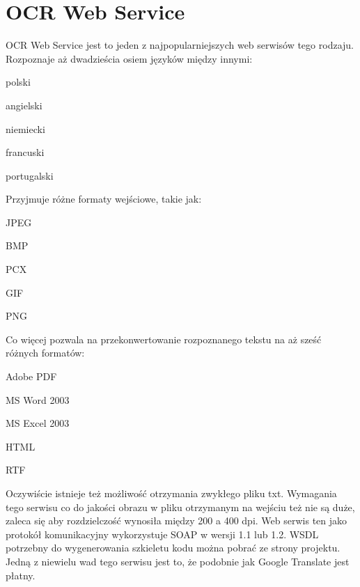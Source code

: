 \section{OCR Web Service}
OCR Web Service jest to jeden z najpopularniejszych web serwisów tego rodzaju. Rozpoznaje aż dwadzieścia osiem języków między innymi:
\begin{item}
	\item polski
	\item angielski
	\item niemiecki
	\item francuski
	\item portugalski
\end{item}
Przyjmuje różne formaty wejściowe, takie jak:
\begin{item}
	\item JPEG\JPG
	\item BMP
	\item PCX
	\item GIF
	\item PNG
	\PDF
\end{item}
Co więcej pozwala na przekonwertowanie rozpoznanego tekstu na aż sześć różnych formatów:
\begin{item}
	\item Adobe PDF
	\item MS Word 2003
	\item MS Excel 2003
	\item HTML
	\item RTF
\end{item}
Oczywiście istnieje też możliwość otrzymania zwykłego pliku txt. Wymagania tego serwisu co do jakości obrazu w pliku otrzymanym na wejściu też nie są duże, zaleca się aby rozdzielczość wynosiła między 200 a 400 dpi. Web serwis ten jako protokół komunikacyjny wykorzystuje SOAP w wersji 1.1 lub 1.2. WSDL potrzebny do wygenerowania szkieletu kodu można pobrać ze strony projektu. Jedną z niewielu wad tego serwisu jest to, że podobnie jak Google Translate jest płatny. 